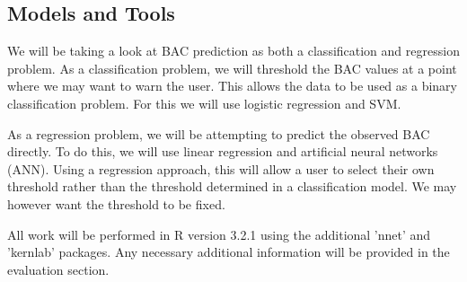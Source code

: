 \subsection{Models and Tools}

We will be taking a look at BAC prediction as both a classification and regression problem. As a classification problem, we will threshold the BAC values at a point where we may want to warn the user. This allows the data to be used as a binary classification problem. For this we will use logistic regression and SVM. 

As a regression problem, we will be attempting to predict the observed BAC directly. To do this, we will use linear regression and artificial neural networks (ANN). Using a regression approach, this will allow a user to select their own threshold rather than the threshold determined in a classification model. We may however want the threshold to be fixed.

All work will be performed in R version 3.2.1 using the additional 'nnet' and 'kernlab' packages. Any necessary additional information will be provided in the evaluation section.